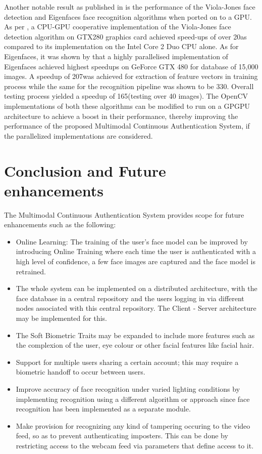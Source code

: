 \documentclass[%
        final,
        internal,
        notitlepage,
        narroweqnarray,
        inline,
        ]{ieee}
\begin{document}
Another notable result as published in \cite{fdetGPU,cudafrec} is the performance of the Viola-Jones face detection and Eigenfaces face recognition algorithms when ported on to a GPU. As per \cite{fdetGPU}, a CPU-GPU cooperative implementation of the Viola-Jones face detection algorithm on GTX280 graphics card achieved speed-ups of over 20\times as compared to its implementation on the Intel Core 2 Duo CPU alone. As for Eigenfaces, it was shown by \cite{cudafrec} that a highly parallelised implementation of Eigenfaces achieved highest speedups on GeForce GTX 480 for database of 15,000 images. A speedup of 207\times was achieved for extraction of feature vectors in training process while the same for the recognition pipeline was shown to be 330\times. Overall testing process yielded a speedup of 165\times (testing over 40 images). The OpenCV implementations of both these algorithms can be modified to run on a GPGPU architecture to achieve a boost in their performance, thereby improving the performance of the proposed Multimodal Continuous Authentication System, if the parallelized implementations are considered. 

\section{Conclusion and Future enhancements} \label{sec:conclusion}
\noindent{}

\noindent{}The Multimodal Continuous Authentication System provides scope for future enhancements such as the following:
\begin{itemize}
\item Online Learning: The training of the user's face model can be improved by introducing Online Training where each time the user is authenticated with a high level of confidence, a few face images are captured and the face model is retrained.
\item The whole system can be implemented on a distributed architecture, with the face database in a central repository and the users logging in via different nodes associated with this central repository. The Client - Server architecture may be implemented for this.
\item The Soft Biometric Traits may be expanded to include more features such as the complexion of the user, eye colour or other facial features like facial hair. 
\item Support for multiple users sharing a certain account; this may require a biometric handoff\cite{Klos00} to occur between users.
\item Improve accuracy of face recognition under varied lighting conditions by implementing recognition using a different algorithm or approach since face recognition has been implemented as a separate module.
\item Make provision for recognizing any kind of tampering occuring to the video feed, so as to prevent authenticating imposters. This can be done by restricting access to the webcam feed via parameters that define access to it.
\end{itemize}


\end{document}
